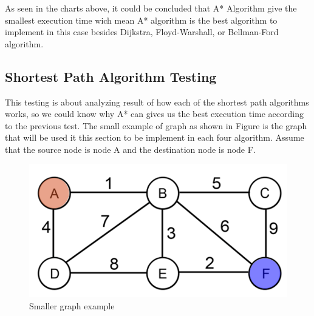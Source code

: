 \vspace{40mm}
As seen in the charts above, it could be concluded that A* Algorithm give the smallest execution time wich mean A* algorithm is the best algorithm to implement in this case besides Dijkstra, Floyd-Warshall, or Bellman-Ford algorithm. 

\subsection{Shortest Path Algorithm Testing}
This testing is about analyzing result of how each of the shortest path algorithms works, so we could know why A* can gives us the best execution time according to the previous test. The small example of graph as shown in Figure is the graph that will be used it this section to be implement in each four algorithm. Assume that the source node is node A and the destination node is node F.

\begin{figure}[h!]
	\centering
	\includegraphics[scale=0.4]{figure21.png}
	\caption{Smaller graph example
	}
	\label{fig:figure21}
\end{figure}

